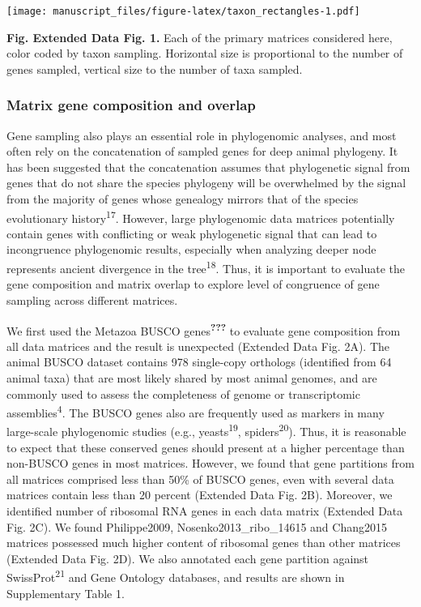 \documentclass[]{article}
\begin{document}
\texttt{[image: manuscript\_files/figure-latex/taxon\_rectangles-1.pdf]}

\textbf{Fig. Extended Data Fig. 1.} Each of the primary matrices
considered here, color coded by taxon sampling. Horizontal size is
proportional to the number of genes sampled, vertical size to the number
of taxa sampled.

\hypertarget{matrix-gene-composition-and-overlap}{%
\subsubsection{Matrix gene composition and
overlap}\label{matrix-gene-composition-and-overlap}}

Gene sampling also plays an essential role in phylogenomic analyses, and
most often rely on the concatenation of sampled genes for deep animal
phylogeny. It has been suggested that the concatenation assumes that
phylogenetic signal from genes that do not share the species phylogeny
will be overwhelmed by the signal from the majority of genes whose
genealogy mirrors that of the species evolutionary
history\textsuperscript{17}. However, large phylogenomic data matrices
potentially contain genes with conflicting or weak phylogenetic signal
that can lead to incongruence phylogenomic results, especially when
analyzing deeper node represents ancient divergence in the
tree\textsuperscript{18}. Thus, it is important to evaluate the gene
composition and matrix overlap to explore level of congruence of gene
sampling across different matrices.

We first used the Metazoa BUSCO genes\textsuperscript{{\textbf{???}}} to
evaluate gene composition from all data matrices and the result is
unexpected (Extended Data Fig. 2A). The animal BUSCO dataset contains
978 single-copy orthologs (identified from 64 animal taxa) that are most
likely shared by most animal genomes, and are commonly used to assess
the completeness of genome or transcriptomic
assemblies\textsuperscript{4}. The BUSCO genes also are frequently used
as markers in many large-scale phylogenomic studies (e.g.,
yeasts\textsuperscript{19}, spiders\textsuperscript{20}). Thus, it is
reasonable to expect that these conserved genes should present at a
higher percentage than non-BUSCO genes in most matrices. However, we
found that gene partitions from all matrices comprised less than 50\% of
BUSCO genes, even with several data matrices contain less than 20
percent (Extended Data Fig. 2B). Moreover, we identified number of
ribosomal RNA genes in each data matrix (Extended Data Fig. 2C). We
found Philippe2009, Nosenko2013\_ribo\_14615 and Chang2015 matrices
possessed much higher content of ribosomal genes than other matrices
(Extended Data Fig. 2D). We also annotated each gene partition against
SwissProt\textsuperscript{21} and Gene Ontology databases, and results
are shown in Supplementary Table 1.
\end{document}
